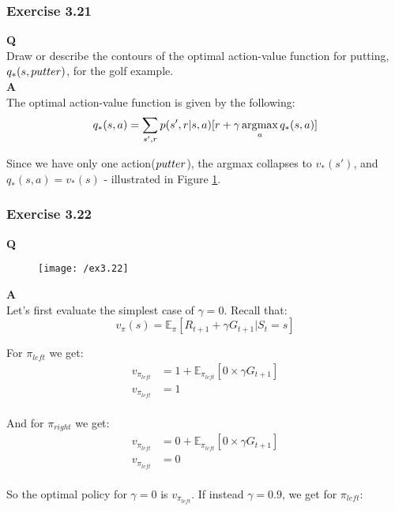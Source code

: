 \subsubsection{Exercise 3.21}
\textbf{Q}\\
Draw or describe the contours of the optimal action-value function for putting, $q_*(s, \mathnormal{putter})$, for the golf example.\\

\textbf{A}\\
The optimal action-value function is given by the following:
\begin{equation}
q_*(s,a)= \sum_{s', r} p(s', r | s, a) [r + \gamma \operatorname*{\arg\!\max}_a q_*(s,a)]\\
\end{equation}

Since we have only one action($\mathnormal{putter}$), the argmax collapses to $v_*(s')$, and $q_*(s,a) = v_*(s)$ - illustrated in Figure \ref{fig:3.20}.

\subsubsection{Exercise 3.22}
\textbf{Q}\\
\begin{figure}[h!]
	\centering
	\texttt{[image: /ex3.22]}
	\label{fig:3.20}
\end{figure}

\textbf{A}\\
Let's first evaluate the simplest case of $\gamma = 0$. Recall that:
\begin{equation}
v_\pi(s) = \mathbb{E}_\pi[R_{t+1} + \gamma G_{t+1} | S_t = s]
\end{equation}

For $\pi_{left}$ we get:
\begin{align}
v_{\pi_{left}} &= 1 + \mathbb{E}_{\pi_{left}} \left[0 \times \gamma G_{t+1} \right] \\
v_{\pi_{left}} &= 1 \\
\end{align}

And for $\pi_{right}$ we get:
\begin{align}
v_{\pi_{left}} &= 0 + \mathbb{E}_{\pi_{left}} \left[0 \times \gamma G_{t+1} \right] \\
v_{\pi_{left}} &= 0 \\
\end{align}

So the optimal policy for $\gamma = 0$ is $v_{\pi_{left}}$. If instead $\gamma = 0.9$, we get for $\pi_{left}$:


